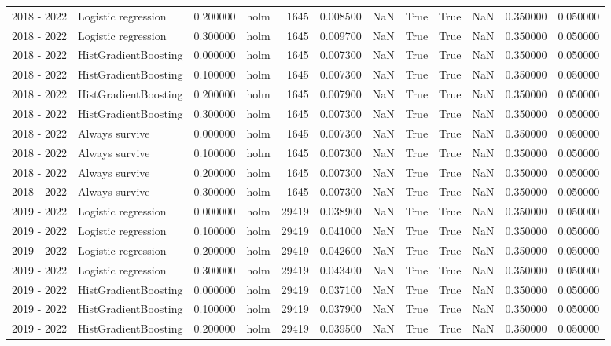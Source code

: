 \begin{tabular}{llrlrrrrrrrr}
2018 - 2022 & Logistic regression & 0.200000 & holm & 1645 & 0.008500 & NaN & True & True & NaN & 0.350000 & 0.050000 \\
2018 - 2022 & Logistic regression & 0.300000 & holm & 1645 & 0.009700 & NaN & True & True & NaN & 0.350000 & 0.050000 \\
2018 - 2022 & HistGradientBoosting & 0.000000 & holm & 1645 & 0.007300 & NaN & True & True & NaN & 0.350000 & 0.050000 \\
2018 - 2022 & HistGradientBoosting & 0.100000 & holm & 1645 & 0.007300 & NaN & True & True & NaN & 0.350000 & 0.050000 \\
2018 - 2022 & HistGradientBoosting & 0.200000 & holm & 1645 & 0.007900 & NaN & True & True & NaN & 0.350000 & 0.050000 \\
2018 - 2022 & HistGradientBoosting & 0.300000 & holm & 1645 & 0.007300 & NaN & True & True & NaN & 0.350000 & 0.050000 \\
2018 - 2022 & Always survive & 0.000000 & holm & 1645 & 0.007300 & NaN & True & True & NaN & 0.350000 & 0.050000 \\
2018 - 2022 & Always survive & 0.100000 & holm & 1645 & 0.007300 & NaN & True & True & NaN & 0.350000 & 0.050000 \\
2018 - 2022 & Always survive & 0.200000 & holm & 1645 & 0.007300 & NaN & True & True & NaN & 0.350000 & 0.050000 \\
2018 - 2022 & Always survive & 0.300000 & holm & 1645 & 0.007300 & NaN & True & True & NaN & 0.350000 & 0.050000 \\
2019 - 2022 & Logistic regression & 0.000000 & holm & 29419 & 0.038900 & NaN & True & True & NaN & 0.350000 & 0.050000 \\
2019 - 2022 & Logistic regression & 0.100000 & holm & 29419 & 0.041000 & NaN & True & True & NaN & 0.350000 & 0.050000 \\
2019 - 2022 & Logistic regression & 0.200000 & holm & 29419 & 0.042600 & NaN & True & True & NaN & 0.350000 & 0.050000 \\
2019 - 2022 & Logistic regression & 0.300000 & holm & 29419 & 0.043400 & NaN & True & True & NaN & 0.350000 & 0.050000 \\
2019 - 2022 & HistGradientBoosting & 0.000000 & holm & 29419 & 0.037100 & NaN & True & True & NaN & 0.350000 & 0.050000 \\
2019 - 2022 & HistGradientBoosting & 0.100000 & holm & 29419 & 0.037900 & NaN & True & True & NaN & 0.350000 & 0.050000 \\
2019 - 2022 & HistGradientBoosting & 0.200000 & holm & 29419 & 0.039500 & NaN & True & True & NaN & 0.350000 & 0.050000 \\

\end{tabular}
